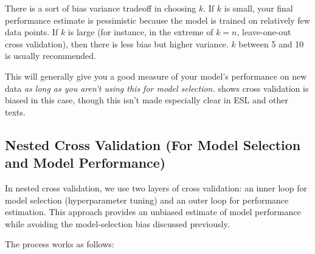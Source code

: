 There is a sort of bias variance tradeoff in choosing $k$. If $k$ is small, your final performance estimate is pessimistic because the model is trained on relatively few data points. If $k$ is large (for instance, in the extreme of $k=n$, leave-one-out cross validation), then there is less bias but higher variance. $k$ between 5 and 10 is usually recommended.
   
This will generally give you a good measure of your model's performance on new data \textit{as long as you aren't using this for model selection.} \cite{varma2006bias} shows cross validation is biased in this case, though this isn't made especially clear in ESL and other texts.

\subsection{Nested Cross Validation (For Model Selection and Model Performance)}

In nested cross validation, we use two layers of cross validation: an inner loop for model selection (hyperparameter tuning) and an outer loop for performance estimation. This approach provides an unbiased estimate of model performance while avoiding the model-selection bias discussed previously.

The process works as follows:

